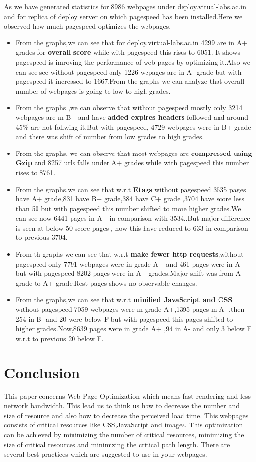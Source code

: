 \documentclass[a4paper,10pt]{IEEEtran}
\begin{document}
 As we have generated statistics for 8986 webpages under
deploy.vitual-labs.ac.in and for replica of deploy server on which pagespeed has
been installed.Here we observed how much pagespeed optimizes the webpages.
\begin{itemize}
\item From the graphs,we can see that for deploy.virtual-labs.ac.in 4299 are in
A+ grades for \textbf{overall score} while with pagespeed this rises to 6051. It
shows pagespeed is imroving the performance of web pages by optimizing it.Also
we can see see without pagespeed only 1226 wepages are in A- grade but with
pagespeed it increased to 1667.From the graphs we can analyze that overall
number of webpages is going to low to high grades.
\item From the graphs ,we can observe that without pagespeed  mostly only 3214
webpages are in B+  and have \textbf{added expires headers} followed  and around
45\% are not follwing it.But with pagespeed, 4729 webpages were in B+ grade and
there was shift of number from low grades to high grades.
\item From the graphs, we can observe that most webpages are \textbf{compressed
using Gzip} and 8257 urls falls under A+ grades while with pagespeed this number
rises to 8761.
\item From the graphs,we can see that w.r.t \textbf{Etags} without pagespeed
3535 pages have A+ grade,831 have B+ grade,384 have C+ grade ,3704 have score
less than 50 but with pagespeed this number shifted to more higher grades.We can
see now 6441 pages in A+  in comparison with 3534..But major difference is seen
at below 50 score pages , now this have reduced to 633 in comparison to previous
3704.
\item From th graphs we can see that w.r.t \textbf{make fewer http
requests},without pagespeed only 7791 webpages were in grade A+  and 461 pages
were in A- but with pagespeed 8202 pages were in A+ grades.Major shift was from 
A- grade to A+ grade.Rest pages shows no observable changes.
\item From the graphs,we can see that w.r.t \textbf{minified JavaScript and CSS}
without pagespeed 7059 webpages were in grade A+,1395 pages in A- ,then 254 in
B- and 20 were below F but with pagespeed this pages shifted to higher
grades.Now,8639 pages were in grade A+ ,94 in A- and only 3 below F w.r.t to
previous 20 below F.
\end{itemize}

\section{Conclusion}
\label{sec-7}
This paper concerns Web Page Optimization which  means fast rendering and less
network bandwidth. This lead us to think us how to decrease the number and size of
resource and also how to decrease the perceived load time. This webpages consists
of critical resources like CSS,JavaScript and images. This optimization can be
achieved by minimizing the number of critical resources, minimizing the size of
critical resources and minimizing the critical path length. There are several
best practices which are suggested to use in your webpages.
\end{document}

